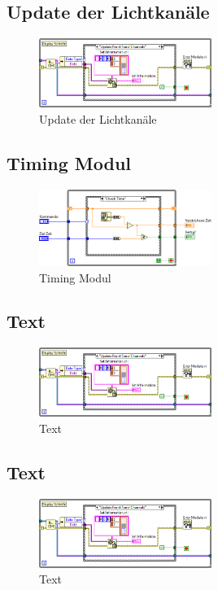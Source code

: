 	

	\subsection{Update der Lichtkanäle}
	\begin{figure}[h!]
	\centering
		\includegraphics[width=0.5\textwidth]{Pics/front-kanale.png}
	\caption{Update der Lichtkanäle}
	\label{fig:a7}
	\end{figure}
	
	\subsection{Timing Modul}
	\begin{figure}[h!]
	\centering
		\includegraphics[width=0.5\textwidth]{Pics/zeit.png}
	\caption{Timing Modul}
	\label{fig:a8}
	\end{figure}
	
	\subsection{Text}
	\begin{figure}[h!]
	\centering
		\includegraphics[width=0.5\textwidth]{Pics/front-kanale.png}
	\caption{Text}
	\label{fig:a9}
	\end{figure}
	
	\subsection{Text}
	\begin{figure}[h!]
	\centering
		\includegraphics[width=0.5\textwidth]{Pics/front-kanale.png}
	\caption{Text}
	\label{fig:a10}
	\end{figure}
	
